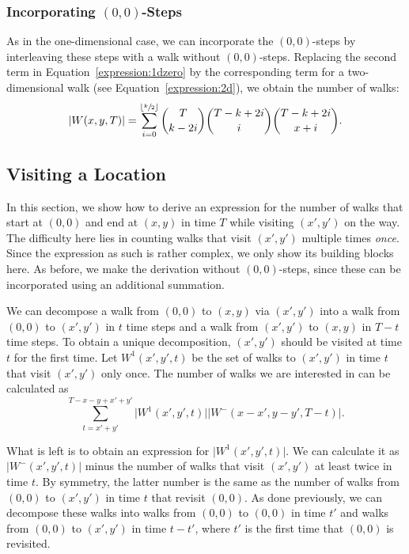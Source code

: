 \documentclass[11pt,a4paper,twoside,british]{article}
\begin{document}
\subsubsection{Incorporating \texorpdfstring{$(0, 0)$}{(0, 0)}-Steps}
As in the one-dimensional case, we can incorporate the $(0, 0)$-steps by
interleaving these steps with a walk without $(0, 0)$-steps.
Replacing the second term in Equation~\ref{expression:1dzero} by the
corresponding term for a two-dimensional walk (see
Equation~\ref{expression:2d}), we obtain the number of walks:
\begin{equation}
\lvert W(x, y, T)\rvert = \sum_{i = 0}^{\lfloor\sfrac{k}{2}\rfloor}
\binom{T}{k - 2i}\binom{T - k + 2i}{i}\binom{T - k + 2i}{x + i}.
\end{equation}

\subsection{Visiting a Location}
In this section, we show how to derive an expression for the number of walks
that start at $(0, 0)$ and end at $(x, y)$ in time $T$ while visiting $(x', y')$
on the way.
The difficulty here lies in counting walks that visit $(x', y')$ multiple times
\emph{once}.
Since the expression as such is rather complex, we only show its building blocks
here.
As before, we make the derivation without $(0, 0)$-steps, since these can be
incorporated using an additional summation.

We can decompose a walk from $(0, 0)$ to $(x, y)$ via $(x', y')$ into a walk
from $(0, 0)$ to $(x', y')$ in $t$ time steps and a walk from $(x', y')$ to
$(x, y)$ in $T - t$ time steps.
To obtain a unique decomposition, $(x', y')$ should be visited at time $t$ for
the first time.
Let $W^1(x', y', t)$ be the set of walks to $(x', y')$ in time $t$ that visit
$(x', y')$ only once.
The number of walks we are interested in can be calculated as
\begin{equation}
\sum_{t = x' + y'}^{T - x - y + x' + y'} \lvert W^1(x', y', t)\rvert
\lvert W^-(x - x', y - y', T - t)\rvert.
\end{equation}

What is left is to obtain an expression for $\lvert W^1(x', y', t)\rvert$.
We can calculate it as $\lvert W^-(x', y', t)\rvert$ minus the number of walks
that visit $(x', y')$ at least twice in time $t$.
By symmetry, the latter number is the same as the number of walks from $(0, 0)$
to $(x', y')$ in time $t$ that revisit $(0, 0)$.
As done previously, we can decompose these walks into walks from $(0, 0)$ to
$(0, 0)$ in time $t'$ and walks from $(0, 0)$ to $(x', y')$ in time $t - t'$,
where $t'$ is the first time that $(0, 0)$ is revisited.
\end{document}

